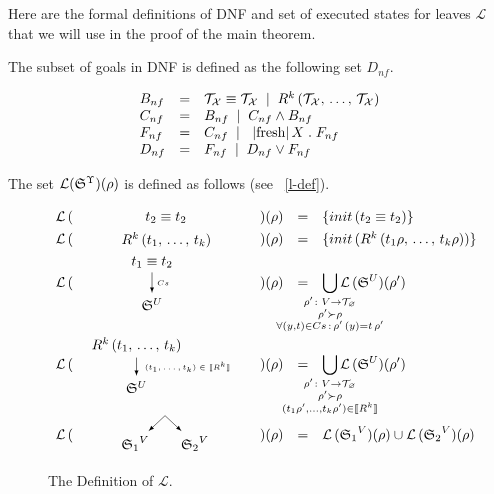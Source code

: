 Here are the formal definitions of DNF and set of executed states for leaves $\mathcal{L}$ that we will use in the proof of the main theorem.

\begin{definition}
The subset of goals in DNF is defined as the following set $D_{nf}$.

\[ \begin{array}{lcl}
B_{nf} & = &  \unigoal{\mathcal{T}_\mathcal{X}}{\mathcal{T}_\mathcal{X}} \; \mid \;
                     \invokegoal{R^k}{\mathcal{T}_\mathcal{X}}{\mathcal{T}_\mathcal{X}} \\
C_{nf} & = & B_{nf} \; \mid \; \conjgoal{C_{nf}}{B_{nf}} \\
F_{nf} & = & C_{nf} \; \mid \; \freshgoal{X}{F_{nf} } \\
D_{nf} & = & F_{nf} \; \mid \; \disjgoal{D_{nf}}{F_{nf}}
\end{array} \]
\end{definition}

\begin{definition}
The set $\mathcal{L}({\mathfrak{S}}^{\Upsilon})(\rho)$ is defined as follows (see \figureword~\ref{l-def}).

\begin{figure}[t]
\[
\begin{array}{rclcl}
 \mathcal{L}\,(&\parbox[m]{1.3cm}{\schemenode{$\unigoal{t_2}{t_2}$}}&)(\rho) &=& \{init\,(\unigoal{t_2}{t_2})\} \\
 \mathcal{L}\,(&\parbox[m]{2.5cm}{\schemenode{$\invokegoal{R^k}{t_1}{t_k}$}}&)(\rho) &=& \{init\,(\invokegoal{R^k}{t_1 \rho}{t_k \rho})\} \\
 \mathcal{L}\,(&\parbox[m]{2cm}{\schemesarrow{$\unigoal{t_1}{t_2}$}{$Cs$}{$\schemewithvset{\mathfrak{S}}{U}$}} &)(\rho) &=&  \smashoperator{\bigcup\limits_{\substack{ \rho' \colon V \to \grterms \\
                                      \rho' \succ \rho \\
                                      \forall (y, t) \in Cs\,:\, \rho'\,(y) = t\, \rho'  }}}
           \mathcal{L}\,(\schemewithvset{\mathfrak{S}}{U})(\rho')  \\
 \mathcal{L}\,(& \parbox[m]{4cm}{\schemedarrow{$\invokegoal{R^k}{t_1}{t_k}$}{ $(t_1, \dots, t_k) \in \sembr{R^k}  $}{$\schemewithvset{\mathfrak{S}}{U}$}} &)(\rho) &=&
      \smashoperator{\bigcup\limits_{\substack{ \rho' \colon V \to \grterms \\
                                      \rho' \succ \rho \\
                                      (t_1 \rho', \dots, t_k \rho') \in \sembr{R^k}  }}}
           \mathcal{L}\,(\schemewithvset{\mathfrak{S}}{U})(\rho')  \\
 \mathcal{L}\,(&\parbox[m]{2.5cm}{\schemefork{$\schemewithvset{\mathfrak{S}_1}{V}$}{$\schemewithvset{\mathfrak{S}_2}{V}$}}&)(\rho) &=&
 \mathcal{L}\,(\schemewithvset{\mathfrak{S}_1}{V})(\rho) \cup \mathcal{L}\,(\schemewithvset{\mathfrak{S}_2}{V})(\rho)
\end{array}
\]
\caption{The Definition of $\mathcal{L}$.}
\label{fig:l-def}
\end{figure}
\end{definition}


